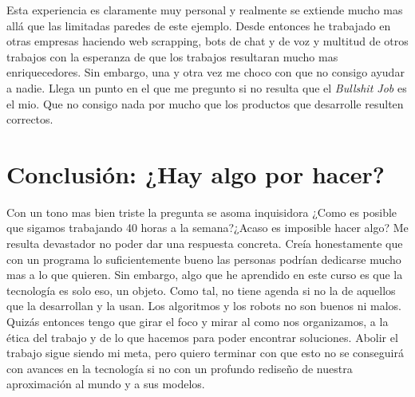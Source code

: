 \documentclass{report}
\begin{document}
Esta experiencia es claramente muy personal y realmente se extiende mucho mas allá que las limitadas paredes de este ejemplo. Desde entonces he trabajado en otras empresas haciendo web scrapping, bots de chat y de voz y multitud de otros trabajos con la esperanza de que los trabajos resultaran mucho mas enriquecedores. Sin embargo, una y otra vez me choco con que no consigo ayudar a nadie. Llega un punto en el que me pregunto si no resulta que el \textit{Bullshit Job} es el mio. Que no consigo nada por mucho que los productos que desarrolle resulten correctos.

\section{Conclusión: ¿Hay algo por hacer?}

Con un tono mas bien triste la pregunta se asoma inquisidora ¿Como es posible que sigamos trabajando 40 horas a la semana?¿Acaso es imposible hacer algo? Me resulta devastador no poder dar una respuesta concreta. Creía honestamente que con un programa lo suficientemente bueno las personas podrían dedicarse mucho mas a lo que quieren. Sin embargo, algo que he aprendido en este curso es que la tecnología es solo eso, un objeto. Como tal, no tiene agenda si no la de aquellos que la desarrollan y la usan. Los algoritmos y los robots no son buenos ni malos. Quizás entonces tengo que girar el foco y mirar al como nos organizamos, a la ética del trabajo y de lo que hacemos para poder encontrar soluciones. Abolir el trabajo sigue siendo mi meta, pero quiero terminar con que esto no se conseguirá con avances en la tecnología si no con un profundo rediseño de nuestra aproximación al mundo y a sus modelos.
\end{document}
